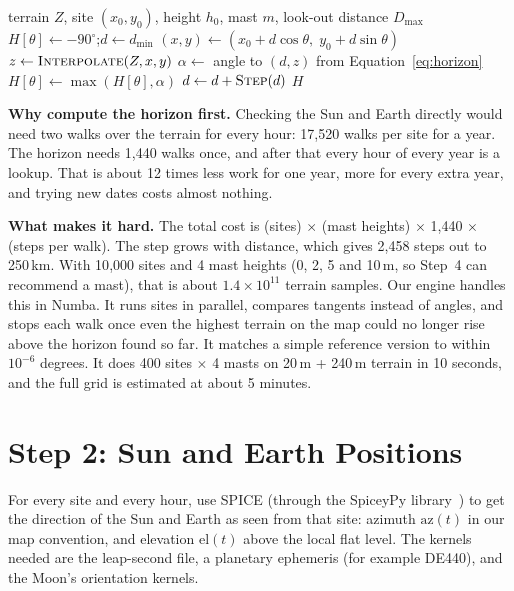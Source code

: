 \documentclass[11pt,a4paper]{article}
\begin{document}
\begin{algorithm}[ht]
\caption{Horizon profile for one site}
\begin{algorithmic}[1]
\Require terrain $Z$, site $(x_0, y_0)$, height $h_0$, mast $m$, look-out distance $D_{\max}$
  \State $H[\theta] \gets -90^\circ$;\quad $d \gets d_{\min}$
    \State $(x, y) \gets (x_0 + d\cos\theta,\; y_0 + d\sin\theta)$
    \State $z \gets \Call{Interpolate}{Z, x, y}$ 
    \State $\alpha \gets$ angle to $(d, z)$ from Equation~\eqref{eq:horizon}
    \State $H[\theta] \gets \max(H[\theta], \alpha)$
    \State $d \gets d + \Call{Step}{d}$ 
  \EndWhile
\EndFor
\State \Return $H$
\end{algorithmic}
\end{algorithm}

\textbf{Why compute the horizon first.} Checking the Sun and Earth directly would need two walks over the terrain for every hour: 17{,}520 walks per site for a year. The horizon needs 1{,}440 walks once, and after that every hour of every year is a lookup. That is about 12 times less work for one year, more for every extra year, and trying new dates costs almost nothing.

\textbf{What makes it hard.} The total cost is (sites) $\times$ (mast heights) $\times$ 1{,}440 $\times$ (steps per walk). The step grows with distance, which gives 2{,}458 steps out to 250\,km. With 10{,}000 sites and 4 mast heights (0, 2, 5 and 10\,m, so Step~4 can recommend a mast), that is about $1.4 \times 10^{11}$ terrain samples. Our engine handles this in Numba. It runs sites in parallel, compares tangents instead of angles, and stops each walk once even the highest terrain on the map could no longer rise above the horizon found so far. It matches a simple reference version to within $10^{-6}$ degrees. It does 400 sites $\times$ 4 masts on 20\,m + 240\,m terrain in 10 seconds, and the full grid is estimated at about 5 minutes.

\section{Step 2: Sun and Earth Positions}

For every site and every hour, use SPICE (through the SpiceyPy library~\cite{spiceypy}) to get the direction of the Sun and Earth as seen from that site: azimuth $\mathrm{az}(t)$ in our map convention, and elevation $\mathrm{el}(t)$ above the local flat level. The kernels needed are the leap-second file, a planetary ephemeris (for example DE440), and the Moon's orientation kernels.
\end{document}
